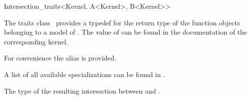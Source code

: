 \begin{ccRefClass}{Intersection_traits<Kernel, A<Kernel>, B<Kernel>>}


\ccDefinition

The traits class \ccClassTemplateName\ provides a typedef for the
return type of the  function objects belonging to a
model of . The value of  can be found
in the  documentation of the corresponding kernel.

For convenience the alias  is provided.

A list of all available specializations can be found in .

\ccTypes

 The type of the resulting intersection between  and .
\end{ccRefClass}

\ccSeeAlso
{}

